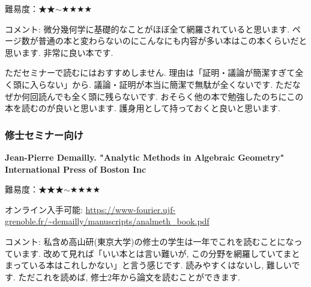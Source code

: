 難易度：★★$\sim$★★★★ \vspace{-6pt} 

コメント: 微分幾何学に基礎的なことがほぼ全て網羅されていると思います. ページ数が普通の本と変わらないのにこんなにも内容が多い本はこの本くらいだと思います. 非常に良い本です. 

ただセミナーで読むにはおすすめしません. 理由は「証明・議論が簡潔すぎて全く頭に入らない」から.  議論・証明が本当に簡潔で無駄が全くないです. ただなぜか何回読んでも全く頭に残らないです. おそらく他の本で勉強したのちにこの本を読むのが良いと思います. 護身用として持っておくと良いと思います. 

\subsubsection{修士セミナー向け}

\textbf{Jean-Pierre Demailly. "Analytic Methods in Algebraic Geometry"  International Press of Boston Inc} \vspace{-6pt}

難易度：★★★$\sim$★★★★ \vspace{-6pt} 

オンライン入手可能: \url{https://www-fourier.ujf-grenoble.fr/~demailly/manuscripts/analmeth_book.pdf}\vspace{-6pt}

コメント: 私含め高山研(東京大学)の修士の学生は一年でこれを読むことになっています. 改めて見れば「いい本とは言い難いが, この分野を網羅していてまとまっている本はこれしかない」と言う感じです. 読みやすくはないし, 難しいです. ただこれを読めば, 修士2年から論文を読むことができます. 

